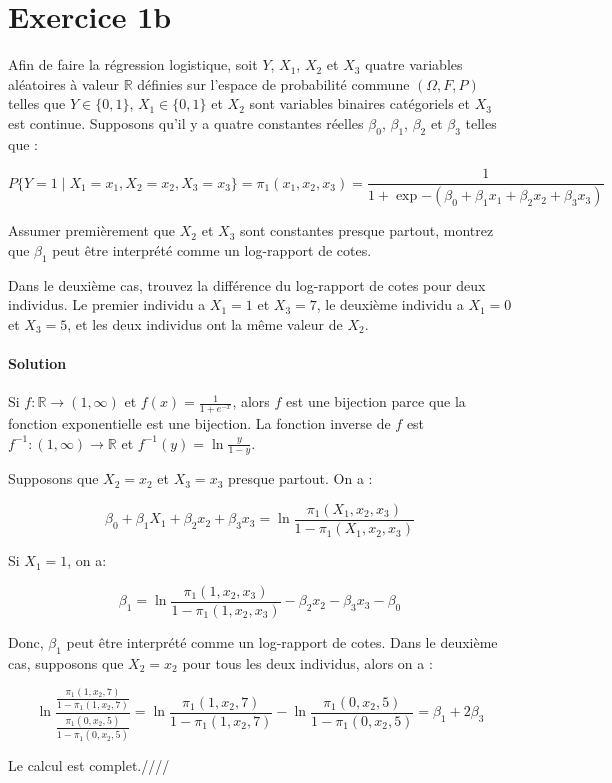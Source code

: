 \documentclass[../main.tex]{subfiles}
\begin{document}
\section*{Exercice 1b}
\begin{CJK*}{UTF8}{gbsn}
Afin de faire la régression logistique, soit $Y$, $X_1$, $X_2$ et $X_3$ quatre 
variables aléatoires à valeur $\mathbb{R}$ définies sur 
l'espace de probabilité commune $(\Omega, F, P)$ telles que 
$Y \in \{0,1\}$, $X_1 \in \{0,1\}$ et $X_2$ sont variables binaires catégoriels et $X_3$ est continue.
Supposons qu'il y a quatre constantes réelles $\beta_0$, $\beta_1$, $\beta_2$ et $\beta_3$ telles que :

\begin{equation*}
    P \{Y = 1 \mid X_1 = x_1, X_2 = x_2, X_3 = x_3 \} = \pi_1(x_1,x_2,x_3) = \frac{1}{1 + \exp{-(\beta_0 + \beta_1 x_1 + \beta_2 x_2 + \beta_3 x_3)}}
\end{equation*}

Assumer premièrement que $X_2$ et $X_3$ sont constantes presque partout, montrez que $\beta_1$ peut 
être interprété comme un log-rapport de cotes. 

Dans le deuxième cas, trouvez la différence du log-rapport de cotes pour deux individus.
Le premier individu a $X_1=1$ et $X_3 = 7$, le deuxième individu a $X_1=0$ et $X_3 = 5$, et les deux 
individus ont la même valeur de $X_2$.

\smallskip
\paragraph{Solution}
Si $f: \mathbb{R} \to (1, \infty)$ et $f(x) = \frac{1}{1+e^{-x}}$, alors $f$ est une bijection parce que la fonction exponentielle est une bijection.
La fonction inverse de $f$ est $f^{-1}: (1, \infty) \to \mathbb{R}$ et $f^{-1}(y) = \ln{\frac{y}{1-y}}$.

Supposons que $X_2 = x_2$ et $X_3 = x_3$ presque partout. On a :

\begin{equation*}
    \beta_0 + \beta_1 X_1 + \beta_2 x_2 + \beta_3 x_3 = \ln{\frac{ \pi_1(X_1,x_2,x_3)}{1-\pi_1(X_1,x_2,x_3)}}
\end{equation*}

Si $X_1 = 1$, on a:

\begin{equation*}
    \beta_1= \ln{\frac{ \pi_1(1,x_2,x_3)}{1-\pi_1(1,x_2,x_3)}} - \beta_2 x_2 - \beta_3 x_3 - \beta_0
\end{equation*}

Donc, $\beta_1$ peut être interprété comme un log-rapport de cotes.
Dans le deuxième cas, supposons que $X_2 = x_2$ pour tous les deux individus, alors on a :

\begin{equation*}
    \ln \frac{ \frac{\pi_1(1,x_2,7)}{1-\pi_1(1,x_2,7)}}{ \frac{\pi_1(0,x_2,5)}{1-\pi_1(0,x_2,5)}} =  
    \ln \frac{\pi_1(1,x_2,7)}{1-\pi_1(1,x_2,7)} - \ln \frac{\pi_1(0,x_2,5)}{1-\pi_1(0,x_2,5)} =  \beta_1 + 2\beta_3
\end{equation*}

Le calcul est complet.////
\end{CJK*}
\end{document}
